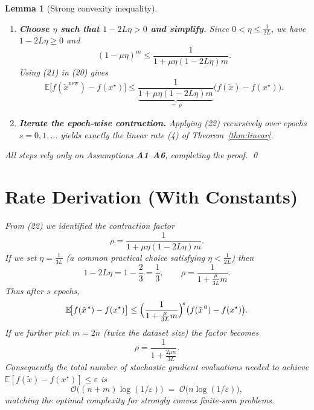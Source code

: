 \documentclass{article}
\newtheorem{lemma}{Lemma}
\newcommand{\E}{\mathbb{E}}
\begin{document}
\begin{lemma}[Strong convexity inequality]
\begin{enumerate}[label=[Step \arabic*], leftmargin=*]
\begin{align}
    &\le \frac{(1-\mu\eta)^m}{\eta m}\cdot\frac{2}{\mu}\bigl(f(\tilde{x})-f(x^\star)\bigr)
        +2L\eta\bigl(f(\tilde{x})-f(x^\star)\bigr).
\tag{20}
\end{align}
\item \textbf{Choose $\eta$ such that $1-2L\eta>0$ and simplify.}  
Since $0<\eta\le\frac{1}{2L}$, we have $1-2L\eta\ge0$ and
\[
    (1-\mu\eta)^m \le \frac{1}{1+\mu\eta(1-2L\eta)m}.
\tag{21}
\]
Using (21) in (20) gives
\[
    \E\!\bigl[f(\tilde{x}^{\text{new}})-f(x^\star)\bigr]
    \le
    \underbrace{\frac{1}{1+\mu\eta(1-2L\eta)m}}_{\displaystyle =\,\rho}
    \bigl(f(\tilde{x})-f(x^\star)\bigr).
\tag{22}
\]
\item \textbf{Iterate the epoch‑wise contraction.}  Applying (22) recursively over epochs $s=0,1,\dots$ yields exactly the linear rate (4) of Theorem~\ref{thm:linear}.
\end{enumerate}
All steps rely only on Assumptions \textbf{A1}–\textbf{A6}, completing the proof. \qed

\section*{Rate Derivation (With Constants)}
From (22) we identified the contraction factor
\[
    \rho = \frac{1}{1+\mu\eta(1-2L\eta)m}.
\]
If we set $\eta=\frac{1}{3L}$ (a common practical choice satisfying $\eta<\frac1{2L}$) then
\[
    1-2L\eta = 1-\frac{2}{3}= \frac{1}{3},
\qquad
    \rho = \frac{1}{1+\frac{\mu}{3L}m}.
\]
Thus after $s$ epochs,
\[
    \E\!\bigl[f(\tilde{x}^{\,s})-f(x^\star)\bigr]
    \le \Bigl(\frac{1}{1+\frac{\mu}{3L}m}\Bigr)^{\!s}
          \bigl(f(\tilde{x}^{\,0})-f(x^\star)\bigr).
\]
If we further pick $m=2n$ (twice the dataset size) the factor becomes
\[
    \rho = \frac{1}{1+\frac{2\mu n}{3L}}.
\]
Consequently the total number of stochastic gradient evaluations needed to achieve
$\E[f(\tilde{x})-f(x^\star)]\le\varepsilon$ is
\[
    \mathcal{O}\!\bigl((n+m)\log(1/\varepsilon)\bigr)
    \;=\;
    \mathcal{O}\!\bigl(n\log(1/\varepsilon)\bigr),
\]
matching the optimal complexity for strongly convex finite‑sum problems.


\end{lemma}
\end{document}
